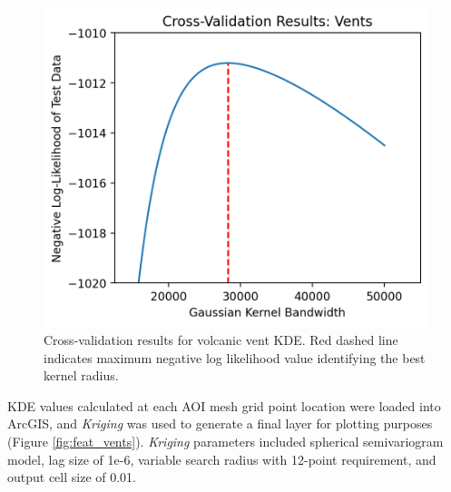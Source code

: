 \begin{figure}[H]
\centering
\includegraphics[scale=.60]{templates/images/Figure-Vents_kde_gridsearchcv_result.png}
\caption[Volcanic vent density parameter tuning]{Cross-validation results for volcanic vent KDE. Red dashed line indicates maximum negative log likelihood value identifying the best kernel radius.}
\label{fig:vent_cv}
\end{figure}

KDE values calculated at each AOI mesh grid point location were loaded into ArcGIS, and \textit{Kriging} was used to generate a final layer for plotting purposes (Figure \ref{fig:feat_vents}). \textit{Kriging} parameters included spherical semivariogram model, lag size of 1e-6, variable search radius with 12-point requirement, and output cell size of 0.01. 
\vfill
\pagebreak

